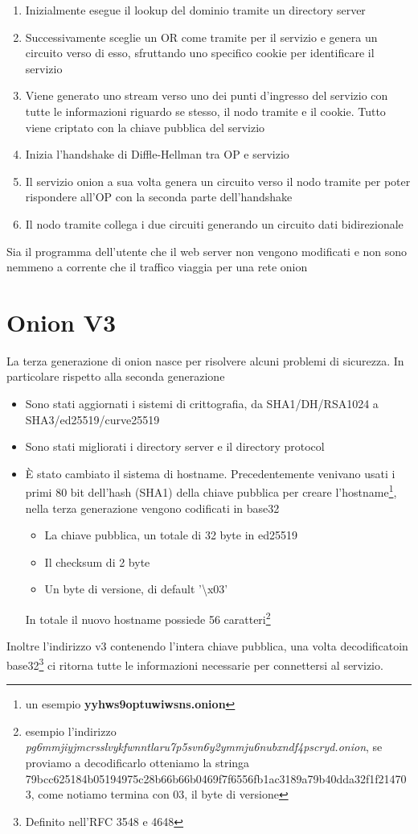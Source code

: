 \begin{enumerate}
    \item Inizialmente esegue il lookup del dominio tramite un directory server
    \item Successivamente sceglie un OR come tramite per il servizio e genera un circuito verso di esso, sfruttando uno specifico cookie per identificare il servizio
    \item Viene generato uno stream verso uno dei punti d'ingresso del servizio con tutte le informazioni riguardo se stesso, il nodo tramite e il cookie. Tutto viene criptato con la chiave pubblica del servizio
    \item Inizia l'handshake di Diffle-Hellman tra OP e servizio
    \item Il servizio onion a sua volta genera un circuito verso il nodo tramite per poter rispondere all'OP con la seconda parte dell'handshake
    \item Il nodo tramite collega i due circuiti generando un circuito dati bidirezionale 
\end{enumerate}
Sia il programma dell'utente che il web server non vengono modificati e non sono nemmeno a corrente che il traffico viaggia per una rete onion \cite{ChaumMixes}
\section{Onion V3}
La terza generazione di onion nasce per risolvere alcuni problemi di sicurezza. In particolare rispetto alla seconda generazione
\begin{itemize}
    \item Sono stati aggiornati i sistemi di crittografia, da SHA1/DH/RSA1024 a SHA3/ed25519/curve25519
    \item Sono stati migliorati i directory server e il directory protocol
    \item È stato cambiato il sistema di hostname. Precedentemente venivano usati i primi 80 bit dell'hash (SHA1) della chiave pubblica per creare l'hostname\footnote{un esempio \textbf{yyhws9optuwiwsns.onion}}, nella terza generazione vengono codificati in base32
    \begin{itemize}
        \item La chiave pubblica, un totale di 32 byte in ed25519
        \item Il checksum di 2 byte
        \item Un byte di versione, di default '\textbackslash x03' 
    \end{itemize}
    In totale il nuovo hostname possiede 56 caratteri\footnote{esempio l'indirizzo \emph{pg6mmjiyjmcrsslvykfwnntlaru7p5svn6y2ymmju6nubxndf4pscryd.onion}, se proviamo a decodificarlo otteniamo la stringa 79bcc625184b05194975c28b66b66b0469f7f6556fb1ac3189a79b40dda32f1f214703, come notiamo termina con 03, il byte di versione}
\end{itemize}
Inoltre l'indirizzo v3 contenendo l'intera chiave pubblica, una volta decodificato\footnotemark[2] in base32\footnote{Definito nell'RFC 3548 e 4648} ci ritorna tutte le informazioni necessarie per connettersi al servizio. \\
\cite{Torv3}

